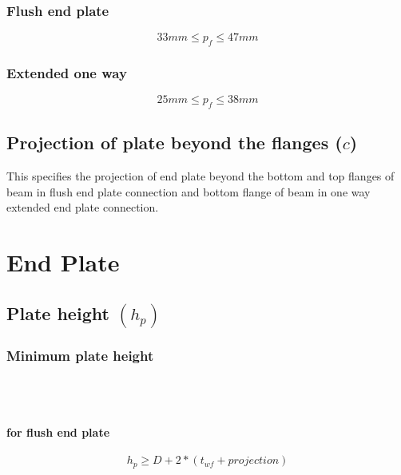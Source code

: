 \documentclass[11.5pt,a4paper,oneside]{report}
\begin{document}
\begin{Form}
		\subsection{Flush end plate}
		\qquad {}
			\begin{equation}
				33 mm \leq p_{f} \leq 47 mm
			\end{equation}
			
		\subsection{Extended one way}
		\qquad {}
			\begin{equation}
				25 mm \leq p_{f} \leq 38 mm
			\end{equation}

\section{Projection of plate beyond the flanges ($c$)}
\label{projection}
This specifies the projection of end plate beyond the bottom and top flanges of beam in flush end plate connection and bottom flange of beam in one way extended end plate connection.


\chapter{End Plate} 
\section{Plate height \boldmath $(h_{p})$}
	\subsection{Minimum plate height}
	\qquad {} \\ \\
	\subsubsection{for flush end plate}
		\begin{equation}
			h_p \ge D + 2 * (t_{wf} + projection)
		\end{equation}
	

\end{Form}
\end{document}

